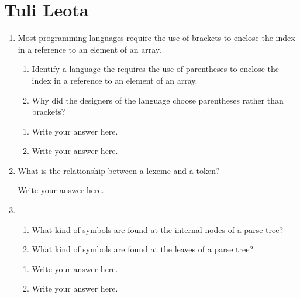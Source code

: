 
\chapter{Tuli Leota}

\begin{enumerate}
  \item Most programming languages require the use of brackets to
    enclose the index in a reference to an element of an array.
  \begin{enumerate}
    \item Identify a language the requires the use of parentheses
      to enclose the index in a reference to an element of an array.
    \item Why did the designers of the language choose parentheses
      rather than brackets?
    \end{enumerate}

  \begin{answer}

  \begin{enumerate}
    \item Write your answer here.
    \item Write your answer here.
    \end{enumerate}

    \end{answer}
    
  \item What is the relationship between a lexeme and a token?

  \begin{answer}

    Write your answer here.

    \end{answer}

  \item
  \begin{enumerate}
    \item What kind of symbols are found at the internal nodes of a
      parse tree?
    \item What kind of symbols are found at the leaves of a parse tree?
    \end{enumerate}

  \begin{answer}

  \begin{enumerate}
    \item Write your answer here.
    \item Write your answer here.
    \end{enumerate}


\end{answer}
\end{enumerate}
